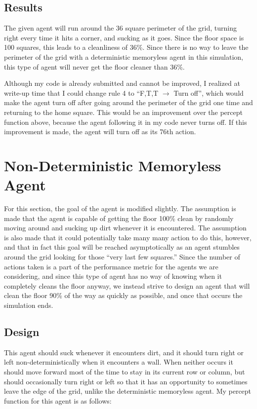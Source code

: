 \documentclass[10 pt.]{article}
\begin{document}
\subsection{Results}
The given agent will run around the 36 square perimeter of the grid, turning right every time it hits a
corner, and sucking as it goes. Since the floor space is 100 squares, this leads to a cleanliness of
36\%. Since there is no way to leave the perimeter of the grid with a deterministic memoryless agent in
this simulation, this type of agent will never get the floor cleaner than 36\%.

Although my code is already submitted and cannot be improved, I realized at write-up time that I could
change rule 4 to ``F,T,T $\rightarrow$ Turn off'', which would make the agent turn off after going around the
perimeter of the grid one time and returning to the home square. This would be an improvement over the percept function above, because the
agent following it in my code never turns off. If this improvement is made, the agent will turn off as its
76th action.

\section{Non-Deterministic Memoryless Agent}
For this section, the goal of the agent is modified slightly. The assumption is made that the agent is
capable of getting the floor 100\% clean by randomly moving around and sucking up dirt whenever it is
encountered. The assumption is also made that it could potentially take many many action to do this,
however, and that in fact this goal will be reached asymptotically as an agent stumbles around the grid
looking for those ``very last few squares.'' 
Since the number of actions taken is a part of the performance metric for the agents we
are considering, and since this type of agent has no way of knowing when it completely cleans the floor
anyway, we instead strive to design an agent that will clean the floor 90\% of the way as quickly as
possible, and once that occurs the simulation ends.

\subsection{Design}
This agent should suck whenever it encounters dirt, and it should turn right or left non-deterministically when
it encounters a wall. When neither occurs it should move forward most of the time to stay in its
current row or column, but should occasionally turn right or left so that it has an opportunity to sometimes
leave the edge of the grid, unlike the deterministic memoryless agent. My percept function for this agent is as
follows:
\end{document}
